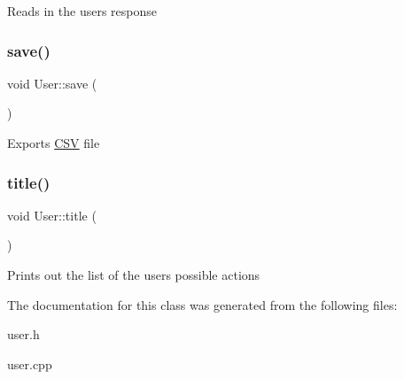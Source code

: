 Reads in the users response \mbox{\label{classUser_a1e6652772cc099e9cb2c76b54c1ce9da}} 
\subsubsection{\texorpdfstring{save()}{save()}}
{\footnotesize\ttfamily void User\+::save (\begin{DoxyParamCaption}{ }\end{DoxyParamCaption})}

Exports \hyperlink{classCSV}{C\+SV} file \mbox{\label{classUser_a3ecab8308e249fe964a75e58eea339dc}} 
\subsubsection{\texorpdfstring{title()}{title()}}
{\footnotesize\ttfamily void User\+::title (\begin{DoxyParamCaption}{ }\end{DoxyParamCaption})}

Prints out the list of the users possible actions 

The documentation for this class was generated from the following files\+:\begin{DoxyCompactItemize}
\item 
user.\+h\item 
user.\+cpp\end{DoxyCompactItemize}
